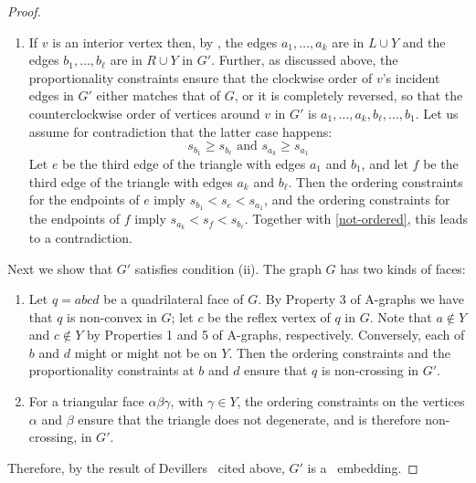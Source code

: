 \begin{proof}
\begin{enumerate}
\begin{enumerate}
			\item If $v$ is an interior vertex then, by , the edges $a_1,\ldots,a_k$ are in $L\cup Y$ and the edges $b_1,\ldots,b_\ell$ are in $R\cup Y$ in $G'$. Further, as discussed above, the proportionality constraints ensure that the clockwise order of $v$'s incident edges in $G'$ either matches that of $G$, or it is completely reversed, so that the counterclockwise order of vertices around $v$ in $G'$ is $a_1,\ldots,a_k,b_\ell,\ldots,b_1$. 	Let us assume for contradiction that the latter case happens:
			\begin{equation}
			\label{eq:not-ordered}
			s_{b_1}\ge s_{b_\ell}
			\text{ and }
			s_{a_k}\ge s_{a_1}
			\end{equation}
			Let $e$ be the third edge of the triangle with edges $a_1$ and $b_1$,
			and let 
			$f$ be the third edge of the triangle with edges $a_k$ and $b_\ell$.
			Then the ordering constraints for the endpoints of $e$ imply
			\begin{math}
			s_{b_1}<s_e<s_{a_1}
			\end{math},
			and the ordering constraints for the endpoints of $f$ imply
			\begin{math}
			s_{a_k}<s_f<s_{b_\ell}
			\end{math}.
			Together with \eqref{not-ordered}, this leads to a contradiction.
		\end{enumerate}
	\end{enumerate}
	
	Next we show that $G'$ satisfies condition (ii). The graph $G$ has two
	kinds of faces:
	\begin{enumerate}
		\item Let $q = abcd$ be a quadrilateral face of $G$. By Property 3 of A-graphs we have that $q$ is non-convex in $G$; let $c$ be the reflex vertex of $q$ in $G$. Note that $a\notin Y$ and $c\notin Y$ by Properties 1 and 5 of A-graphs, respectively. Conversely, each of $b$ and $d$ might or might not be on $Y$. Then the ordering constraints and the proportionality constraints at $b$ and $d$ ensure that $q$ is non-crossing in $G'$.
		
		
		\item
		For a triangular face $\alpha\beta\gamma$, with $\gamma\in Y$, 
		the ordering constraints on the vertices $\alpha$ and $\beta$
		ensure that the triangle does not degenerate, and is therefore non-crossing, in $G'$.
	\end{enumerate}
	
	Therefore, by the result
	of Devillers \etal\
	cited above, $G'$ is a \Fary\ embedding. %
\end{proof}

